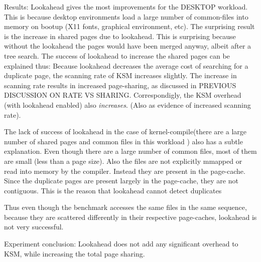 \documentclass[10pt,a4paper]{article}
\begin{document}
Results: Lookahead gives the most improvements for the DESKTOP workload. This is because desktop environments load a large number of common-files into memory on bootup (X11 fonts, graphical environment, etc).
The surprising result is the increase in shared pages due to lookahead. This is surprising because without the lookahead the pages would have been merged anyway, albeit after a tree search. The success of lookahead to increase the shared pages can be explained thus:
Because lookahead decreases the average cost of searching for a duplicate page, the scanning rate of KSM increases slightly. The increase in scanning rate results in increased page-sharing, as discussed in PREVIOUS DISCUSSION ON RATE VS SHARING.
Correspondigly, the KSM overhead (with lookahead enabled) also \emph{increases}. (Also as evidence of increased scanning rate).

The lack of success of lookahead in the case of kernel-compile(there are a large number of shared pages and common files in this workload ) also has a subtle explanation. 
Even though there are a large number of common files, most of them are small (less than a page size). Also the files are not explicitly mmapped or read into memory by the compiler. Instead they are present in the page-cache. Since the duplicate pages are present largely in the page-cache, they are not contiguous. This is the reason that lookahead cannot detect duplicates 

Thus even though the benchmark accesses the same files in the same sequence, because they are scattered differently in their respective page-caches, lookahead is not very successful.

Experiment conclusion:
Lookahead does not add any significant overhead to KSM, while increasing the total page sharing.



\end{document}
